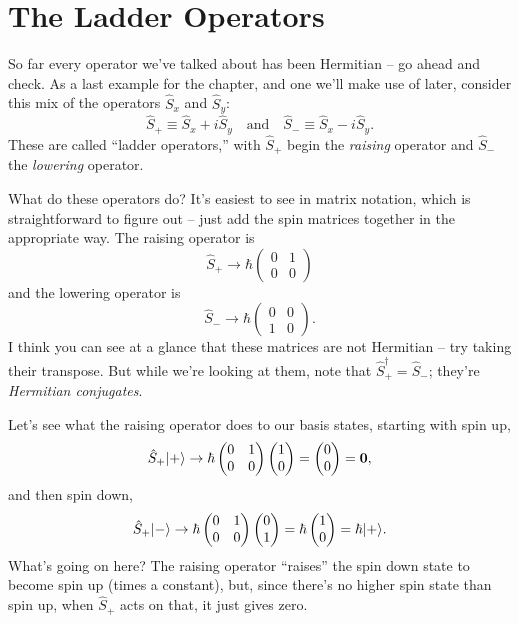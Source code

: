 \section{The Ladder Operators}

So far every operator we've talked about has been Hermitian -- go ahead and check.  As a last example for the chapter, and one we'll make use of later, consider this mix of the operators $\hat{S}_x$ and $\hat{S}_y$:
\begin{equation}
\hat{S}_+ \equiv \hat{S}_x + i\hat{S}_y \quad \text{and} \quad \hat{S}_- \equiv \hat{S}_x - i\hat{S}_y.
\end{equation}
These are called ``ladder operators,'' with $\hat{S}_+$ begin the \emph{raising} operator and $\hat{S}_-$ the \emph{lowering} operator.

What do these operators do?  It's easiest to see in matrix notation, which is straightforward to figure out -- just add the spin matrices together in the appropriate way.  The raising operator is
\begin{equation}
\hat{S}_+ \to \hbar \begin{pmatrix} 0 & 1 \\ 0 & 0 \end{pmatrix}
\end{equation}
and the lowering operator is
\begin{equation}
\hat{S}_- \to \hbar \begin{pmatrix} 0 & 0 \\ 1 & 0 \end{pmatrix}.
\end{equation}
I think you can see at a glance that these matrices are not Hermitian -- try taking their transpose.  But while we're looking at them, note that $\hat{S}_+^\dagger = \hat{S}_-$; they're \emph{Hermitian conjugates}.

Let's see what the raising operator does to our basis states, starting with spin up,
\[
\hat{S}_+ | + \rangle \to \hbar \begin{pmatrix} 0 & 1 \\ 0 & 0 \end{pmatrix} \begin{pmatrix} 1 \\ 0 \end{pmatrix} = \begin{pmatrix} 0 \\ 0 \end{pmatrix} = \mathbf{0},
\]
and then spin down,
\[
\hat{S}_+ | - \rangle \to \hbar \begin{pmatrix} 0 & 1 \\ 0 & 0 \end{pmatrix} \begin{pmatrix} 0 \\ 1 \end{pmatrix} = \hbar \begin{pmatrix} 1 \\ 0 \end{pmatrix} = \hbar | + \rangle.
\]
What's going on here?  The raising operator ``raises'' the spin down state to become spin up (times a constant), but, since there's no higher spin state than spin up, when $\hat{S}_+$ acts on that, it just gives zero.

